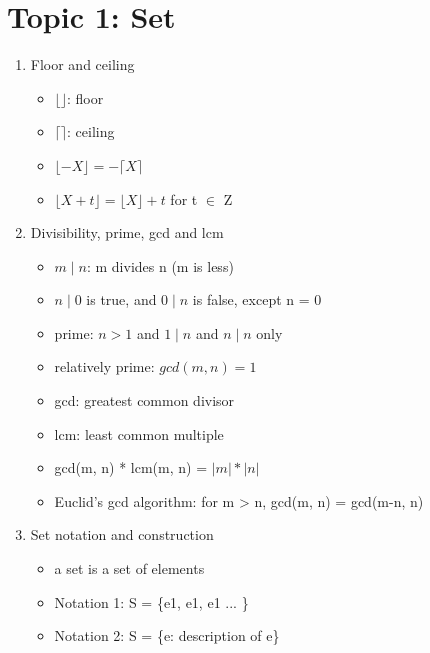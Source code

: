 \documentclass[11pt, a4paper]{article}
\begin{document}
\graphicspath{{/}}

\section*{Topic 1: Set}
\begin{enumerate}
    \item Floor and ceiling
        \begin{itemize}
            \item $\lfloor \rfloor$: floor
            \item $\lceil \rceil$: ceiling
            \item $\lfloor -X \rfloor = - \lceil X \rceil$
            \item $\lfloor X + t \rfloor = \lfloor X \rfloor + t$ for t $\in$ Z
        \end{itemize}
    \item Divisibility, prime, gcd and lcm
        \begin{itemize}
            \item $m \mid n$: m divides n (m is less)
            \item $n \mid 0$ is true, and $0 \mid n$ is false, except n = 0
            \item prime: $n > 1$ and $1 \mid n$ and $n \mid n$ only
            \item relatively prime: $gcd(m, n) = 1$
            \item gcd: greatest common divisor
            \item lcm: least common multiple
            \item gcd(m, n) * lcm(m, n) = $|m| * |n|$
            \item Euclid's gcd algorithm: for m > n, gcd(m, n) = gcd(m-n, n)
        \end{itemize}
    \item Set notation and construction
        \begin{itemize}
            \item a set is a set of elements
            \item Notation 1: S = \{e1, e1, e1 ... \}
            \item Notation 2: S = \{e: description of e\}

\end{itemize}
\end{enumerate}
\end{document}

